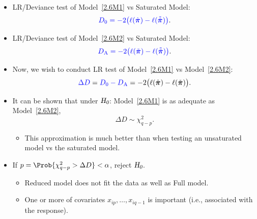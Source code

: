 \documentclass{article}\usepackage[]{graphicx}\usepackage[svgnames]{xcolor}
\newcommand{\HN}{\textsl{H}_{\textsl{0}}}%
\providecommand{\Vector}[1]{\bm{#1}}%
\begin{document}
\begin{itemize}
      \item LR/Deviance test of Model~\ref{2.6M1} vs Saturated Model:
            \[ \textcolor{Blue}{D_0=-2\bigl(\ell(\hat{\Vector{\pi}})-\ell(\tilde{\tilde{\Vector{\pi}}})\bigr)}. \]
      \item LR/Deviance test of Model~\ref{2.6M2} vs Saturated Model:
            \[ \textcolor{Blue}{D_\text{A}=-2\bigl(\ell(\tilde{\Vector{\pi}})-\ell(\tilde{\tilde{\Vector{\pi}}})\bigr)}. \]
      \item Now, we wish to conduct LR test of Model~\ref{2.6M1} vs Model~\ref{2.6M2}:
            \[ \textcolor{Blue}{\Delta D} = \textcolor{Blue}{D_0-D_{\text{A}}}=-2\bigl(\ell(\hat{\Vector{\pi}})-\ell(\tilde{\Vector{\pi}})\bigr). \]
      \item It can be shown that under $ \HN $: Model~\ref{2.6M1} is as adequate as Model~\ref{2.6M2},
            \[ \Delta D \sim \chi^2_{q-p}. \]
            \begin{itemize}
                  \item This approximation is much better than when testing an unsaturated
                        model vs the saturated model.
            \end{itemize}
      \item If $ p=\Prob{\chi^2_{q-p}>\Delta D}<\alpha $, reject $ \HN $.
            \begin{itemize}
                  \item Reduced model does not fit the data as well as Full model.
                  \item One or more of covariates $ x_{ip},\ldots,x_{iq-1} $ is important (i.e., associated with the response).
            \end{itemize}
\end{itemize}
\end{document}

